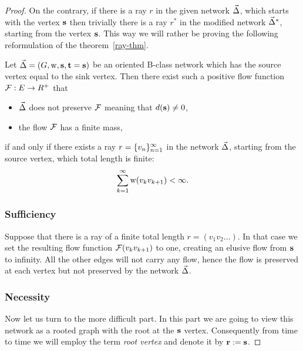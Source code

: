 \documentclass[12pt]{article}
\begin{document}
\begin{proof}
      On the contrary, if there is a ray $r$ in the given network $\vec{\Delta}$, which starts with the vertex $\mathbf{s}$
        then trivially there is a ray $r^*$ in the modified network $\vec{\Delta}^*$, starting from the vertex $\mathbf{s}$.
      This way we will rather be proving the following reformulation of the theorem~\ref{ray-thm}.
      \begin{theorem*}
        Let $\vec{\Delta} = (G, \mathrm{w}, \mathbf{s}, \mathbf{t} = \mathbf{s})$ be an oriented B-class network which has
          the source vertex equal to the sink vertex.
        Then there exist such a positive flow function $\mathcal{F}: E \to R^{+}$ that
        \begin{itemize}
          \item $\vec{\Delta}$ does not preserve $\mathcal{F}$ meaning that $d(\mathbf{s}) \neq 0$,
          \item the flow $\mathcal{F}$ has a finite mass,
        \end{itemize}
          if and only if there exists a ray $r = \{{v}_n\}_{n=1}^\infty$ in the network $\vec{\Delta}$, starting from the source vertex, which total length is finite:
          \[
            \sum_{k=1}^\infty \mathrm{w}(v_k v_{k+1}) < \infty.
          \]
      \end{theorem*}
      \subsubsection*{Sufficiency}
      Suppose that there is a ray of a finite total length $r=(v_1 v_2 \dots)$. 
      In that case we set the resulting flow function $\mathcal{F}(v_k v_{k+1})$ to one, creating an elusive flow
        from $\mathbf{s}$ to infinity. All the other edges will not carry any flow, hence the flow is preserved
        at each vertex but not preserved by the network $\vec{\Delta}$.
      \subsubsection*{Necessity}
      Now let us turn to the more difficult part.
      In this part we are going to view this network as a rooted graph with the root at the $\mathbf{s}$ vertex.
      Consequently from time to time we will employ the term \emph{root vertex} and denote it by $\mathbf{r} := \mathbf{s}$.


\end{proof}
\end{document}
